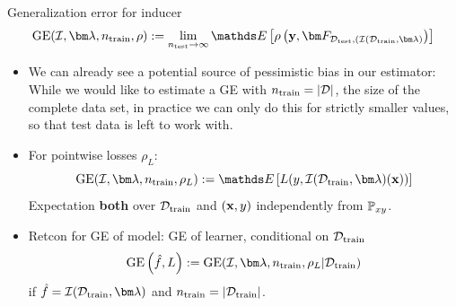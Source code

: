 \documentclass[11pt,compress,t,notes=noshow, xcolor=table]{beamer}
\begin{document}
\begin{vbframe}{Generalization error for inducer}
  $$\GEfull := 
  \lim_{\ntest \rightarrow \infty} \E \left[ \rho \left(
  \yv, \F_{\Dtest, (\ind(\D_{\mathrm{train}}, \lamv)} 
  \right)\right]$$
\begin{itemize}
  \item We can already see a potential source of pessimistic bias in our
      estimator: While we would like to estimate a GE with 
      $n_{\mathrm{train}} = |\mathcal{D}|$, the size of the complete data set, 
      in practice we can only do this for strictly smaller values, so that test data is left to work with.
  \item For pointwise losses $\rho_L$:
      $$\GE(\ind, \lamv, n_\mathrm{train}, \rho_L) := 
      \E \left[ L(y, \ind(\D_{\mathrm{train}}, \lamv)(\xv)) \right]$$
  Expectation \textbf{both} over $\mathcal{D}_{\text{train}}$ and $(\mathbf{x},y)$ independently from $\mathbb{P}_{xy}$.
 \item Retcon for GE of model: GE of learner, conditional on $\mathcal{D}_{\text{train}}$
     $$\GEfL := \GE(\ind, \lamv, n_{\mathrm{train}}, \rho_L | \Dtrain) $$
   if $\fh = \ind(\Dtrain, \lamv)$ and $n_\mathrm{train} = |\mathcal{D}_{\text{train}}|$.
\end{itemize}



\end{vbframe}







\endlecture
\end{document}
